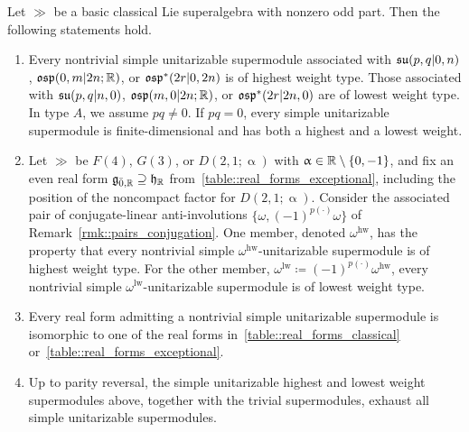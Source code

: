 \begin{theorem}
\label{theorem::unitary-highest-lowest-weight}
Let $\gg$ be a basic classical Lie superalgebra with nonzero odd part. Then the following statements hold.
\begin{enumerate}
\item[(a)]
Every nontrivial simple unitarizable supermodule associated with ${\mathfrak{su}}(p,q\vert0,n)$, ${\mathfrak{osp}}(0,m\vert2n;{\mathbb R})$, or ${\mathfrak{osp}}^{\ast}(2r\vert0,2n)$ is of highest weight type. Those associated with ${\mathfrak{su}}(p,q\vert n,0)$, ${\mathfrak{osp}}(m,0\vert2n;{\mathbb R})$, or ${\mathfrak{osp}}^{\ast}(2r\vert2n,0)$ are of lowest weight type. In type $A$, we assume $pq\neq0$. If $pq=0$, every simple unitarizable supermodule is finite-dimensional and has both a highest and a lowest weight.

\item[(b)]
Let $\gg$ be $F(4)$, $G(3)$, or $D(2,1;\upalpha)$ with $\upalpha\in{\mathbb R}\setminus\{0,-1\}$, and fix an even real form ${\mathfrak{g}}_{\bar0,{\mathbb R}}\supseteq{\mathfrak h}_{{\mathbb R}}$ from~\eqref{table::real_forms_exceptional}, including the position of the noncompact factor for $D(2,1;\upalpha)$. Consider the associated pair of conjugate-linear anti-involutions $\{\omega,(-1)^{p(\cdot)}\omega\}$ of Remark~\ref{rmk::pairs_conjugation}. One member, denoted $\omega^{\mathrm{hw}}$, has the property that every nontrivial simple $\omega^{\mathrm{hw}}$-unitarizable supermodule is of highest weight type. For the other member, $\omega^{\mathrm{lw}}\coloneqq(-1)^{p(\cdot)}\omega^{\mathrm{hw}}$, every nontrivial simple $\omega^{\mathrm{lw}}$-unitarizable supermodule is of lowest weight type.
\item[(c)]
Every real form admitting a nontrivial simple unitarizable supermodule is isomorphic to one of the real forms in~\eqref{table::real_forms_classical} or~\eqref{table::real_forms_exceptional}.

\item[(d)]
Up to parity reversal, the simple unitarizable highest and lowest weight supermodules above, together with the trivial supermodules, exhaust all simple unitarizable supermodules.
\end{enumerate}
\end{theorem}


